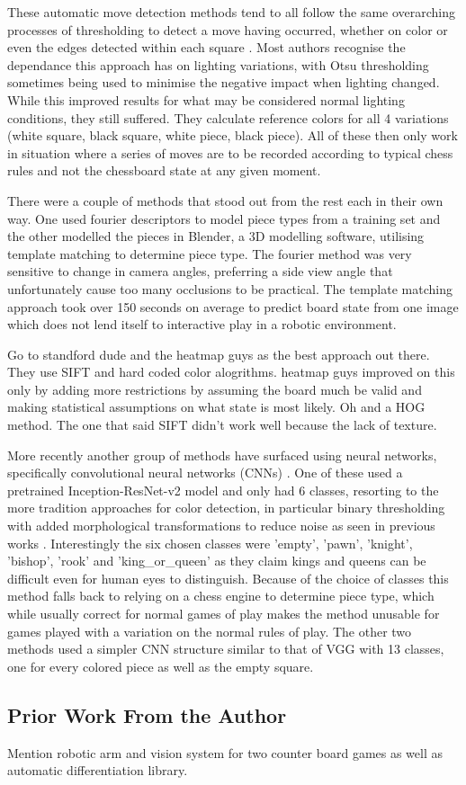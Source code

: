 These automatic move detection methods tend to all follow the same overarching processes of thresholding to detect a move having occurred, 
whether on color \cite{} or even the edges detected within each square \cite{}.  
Most authors recognise the dependance this approach has on lighting variations, with Otsu thresholding \cite{} sometimes being used to minimise 
the negative impact when lighting changed.  While this improved results for what may be considered normal lighting conditions, they still suffered.
They calculate reference colors for all 4 variations (white square, black square, white piece, black piece).  
All of these then only work in situation where a series of moves are to be recorded according to typical chess rules and not the chessboard state at any given moment.

There were a couple of methods that stood out from the rest each in their own way.  One used fourier descriptors to model piece types from a training set
and the other modelled the pieces in Blender, a 3D modelling software, utilising template matching to determine piece type.  The fourier method was very sensitive 
to change in camera angles, preferring a side view angle that unfortunately cause too many occlusions to be practical.  The template matching approach
took over 150 seconds on average to predict board state from one image which does not lend itself to interactive play in a robotic environment.

Go to standford dude and the heatmap guys as the best approach out there. They use SIFT and hard coded color alogrithms.  heatmap guys improved on this 
only by adding more restrictions by assuming the board much be valid and making statistical assumptions on 
what state is most likely.  Oh and a HOG method.  The one that said SIFT didn't work well because the lack of texture.

More recently another group of methods have surfaced using neural networks, specifically convolutional neural networks (CNNs) \cite{}.
One of these used a pretrained Inception-ResNet-v2 model \cite{} and only had 6 classes, resorting to the more tradition approaches for color detection,
in particular binary thresholding with added morphological transformations to reduce noise as seen in previous works \cite{}.  
Interestingly the six chosen classes were 'empty', 'pawn', 'knight', 'bishop', 'rook' and 'king\_or\_queen' as they claim kings and queens can be 
difficult even for human eyes to distinguish.  Because of the choice of classes this method falls back to relying on a chess engine to determine piece type,
which while usually correct for normal games of play makes the method unusable for games played with a variation on the normal rules of play.
The other two methods used a simpler CNN structure similar to that of VGG \cite{} with 13 classes, one for every colored piece as well as the empty square.


\subsection{Prior Work From the Author}
Mention robotic arm and vision system for two counter board games as well as automatic differentiation library.

